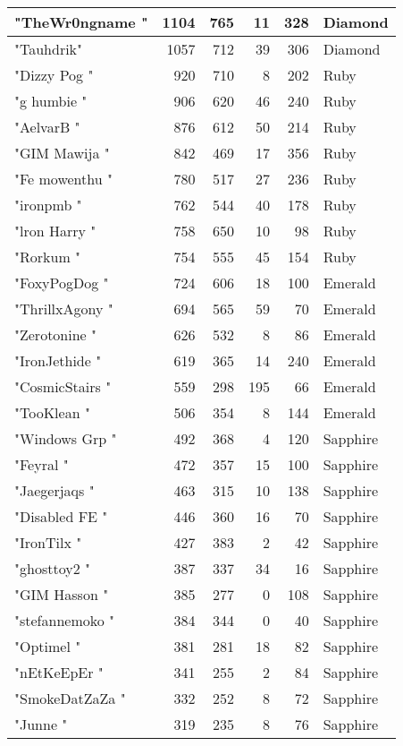 \documentclass{article}
\begin{document}
\begin{table}[htbp]
\begin{tabular}{|l|r|r|r|r|l|}
"TheWr0ngname " & 1104 & 765 & 11 & 328 & Diamond \\ \hline
"Tauhdrik" & 1057 & 712 & 39 & 306 & Diamond \\ \hline
"Dizzy Pog " & 920 & 710 & 8 & 202 & Ruby \\ \hline
"g humbie " & 906 & 620 & 46 & 240 & Ruby \\ \hline
"AelvarB " & 876 & 612 & 50 & 214 & Ruby \\ \hline
"GIM Mawija " & 842 & 469 & 17 & 356 & Ruby \\ \hline
"Fe mowenthu " & 780 & 517 & 27 & 236 & Ruby \\ \hline
"ironpmb " & 762 & 544 & 40 & 178 & Ruby \\ \hline
"lron Harry " & 758 & 650 & 10 & 98 & Ruby \\ \hline
"Rorkum " & 754 & 555 & 45 & 154 & Ruby \\ \hline
"FoxyPogDog " & 724 & 606 & 18 & 100 & Emerald \\ \hline
"ThrillxAgony " & 694 & 565 & 59 & 70 & Emerald \\ \hline
"Zerotonine " & 626 & 532 & 8 & 86 & Emerald \\ \hline
"IronJethide " & 619 & 365 & 14 & 240 & Emerald \\ \hline
"CosmicStairs " & 559 & 298 & 195 & 66 & Emerald \\ \hline
"TooKlean " & 506 & 354 & 8 & 144 & Emerald \\ \hline
"Windows Grp " & 492 & 368 & 4 & 120 & Sapphire \\ \hline
"Feyral " & 472 & 357 & 15 & 100 & Sapphire \\ \hline
"Jaegerjaqs " & 463 & 315 & 10 & 138 & Sapphire \\ \hline
"Disabled FE " & 446 & 360 & 16 & 70 & Sapphire \\ \hline
"IronTilx " & 427 & 383 & 2 & 42 & Sapphire \\ \hline
"ghosttoy2 " & 387 & 337 & 34 & 16 & Sapphire \\ \hline
"GIM Hasson " & 385 & 277 & 0 & 108 & Sapphire \\ \hline
"stefannemoko " & 384 & 344 & 0 & 40 & Sapphire \\ \hline
"Optimel " & 381 & 281 & 18 & 82 & Sapphire \\ \hline
"nEtKeEpEr " & 341 & 255 & 2 & 84 & Sapphire \\ \hline
"SmokeDatZaZa " & 332 & 252 & 8 & 72 & Sapphire \\ \hline
"Junne " & 319 & 235 & 8 & 76 & Sapphire \\ \hline

\end{tabular}
\end{table}
\end{document}
